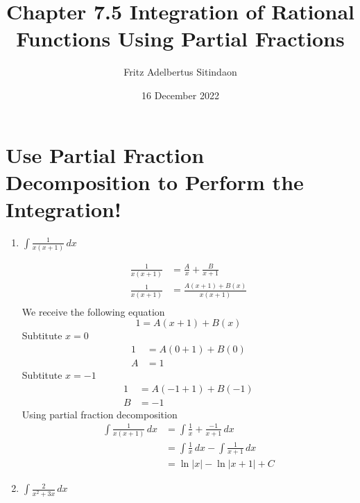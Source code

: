 \documentclass[12pt]{article}
\title{Chapter 7.5 Integration of Rational Functions Using Partial Fractions}
\author{Fritz Adelbertus Sitindaon}
\date{16 December 2022}
\begin{document}
\maketitle

\section{Use Partial Fraction Decomposition to Perform the Integration!}  
  
\begin{enumerate}
\item $\displaystyle\int \frac{1}{x(x+1)}\,dx$

\begin{equation*}
  \begin{aligned}
  \frac{1}{x(x+1)}&=\frac{A}{x}+\frac{B}{x+1}\\
  \frac{1}{x(x+1)}&=\frac{A(x+1)+B(x)}{x(x+1)}\\
  \end{aligned}
\end{equation*}
We receive the following equation
$$1=A(x+1)+B(x)$$
Subtitute $x = 0$
\begin{equation*}
  \begin{aligned}
  1&=A(0+1)+B(0)\\
  A&=1
  \end{aligned}
\end{equation*}
Subtitute $x = -1$
\begin{equation*}
  \begin{aligned}
  1&=A(-1+1)+B(-1)\\
  B&=-1
  \end{aligned}
\end{equation*}
Using partial fraction decomposition
\begin{equation*}
  \begin{aligned}
  \int \frac{1}{x(x+1)}\,dx&=\int\frac{1}{x}+\frac{-1}{x+1}\,dx\\
  &=\int\frac{1}{x}\,dx-\int\frac{1}{x+1}\,dx\\
  &=\ln|x|-\ln|x+1|+C
  \end{aligned}
\end{equation*}

\item $\displaystyle\int\frac{2}{x^{2}+3x}\,dx$


\end{enumerate}
\end{document}
